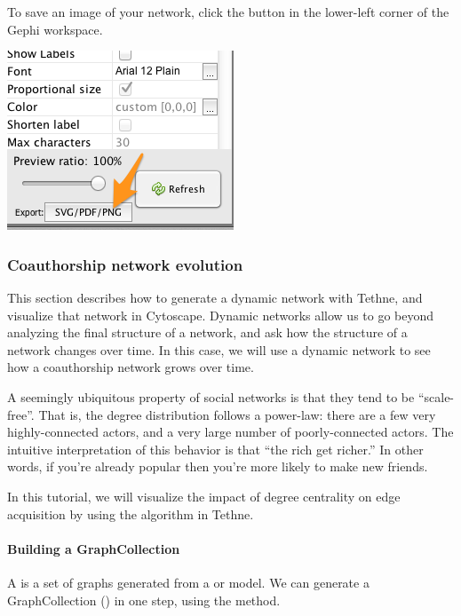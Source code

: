 \documentclass[letterpaper,10pt,english]{sphinxmanual}
\begin{document}
To save an image of your network, click the  button in the lower-left
corner of the Gephi workspace.

{\hfill\includegraphics{coauthors.30.png}\hfill}


\subsubsection{Coauthorship network evolution}
\label{tutorial.coauthors:coauthorship-network-evolution}
This section describes how to generate a dynamic network with Tethne, and visualize that
network in Cytoscape. Dynamic networks allow us to go beyond analyzing the final structure
of a network, and ask how the structure of a network changes over time. In this case,
we will use a dynamic network to see how a coauthorship network grows over time.

A seemingly ubiquitous property of social networks is that they tend to be ``scale-free''.
That is, the degree distribution follows a power-law: there are a few very
highly-connected actors, and a very large number of poorly-connected actors.
The intuitive interpretation of this behavior is that ``the rich get richer.'' In other
words, if you're already popular then you're more likely to make new friends.

In this tutorial, we will visualize the impact of degree centrality on edge acquisition
by using the {\hyperref[tethne.analyze.collection:tethne.analyze.collection.attachment_probability]{}} algorithm in Tethne.


\paragraph{Building a GraphCollection}
\label{tutorial.coauthors:building-a-graphcollection}
A {\hyperref[tethne.classes.graphcollection:tethne.classes.graphcollection.GraphCollection]{}} is a set of graphs generated from a {\hyperref[tethne.classes.corpus:tethne.classes.corpus.Corpus]{}} or model.
We can generate a GraphCollection () in one step, using the
 method.
\end{document}
